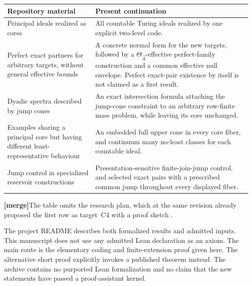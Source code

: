 \documentclass[11pt,letterpaper]{article}
\theoremstyle{plain}
\theoremstyle{definition}
\theoremstyle{remark}
\numberwithin{equation}{section}
\newcommand{\mergenote}[1]{\par\smallskip\noindent
 {\small\textsf{\textbf{[merge]}}\enspace #1}\par\smallskip}
\begin{document}
\begin{center}\small
\begin{tabularx}{\textwidth}{@{}>{\raggedright\arraybackslash}p{}>{\raggedright\arraybackslash}X@{}}
\toprule
Repository material & Present continuation\\
\midrule
Principal ideals realized as cores & All countable Turing ideals realized by one explicit two-level code.\\[4pt]
Perfect exact partners for arbitrary targets, without general effective bounds & A concrete normal form for the new targets, followed by a $\Theta_{\vec A}$-effective perfect-family construction and a common effective null envelope. Perfect exact-pair existence by itself is not claimed as a first result.\\[4pt]
Dyadic spectra described by jump cones & An exact intersection formula attaching the jump-cone constraint to an arbitrary row-finite mass problem, while leaving its core unchanged.\\[4pt]
Examples sharing a principal core but having different least-representative behaviour & An embedded full upper cone in every core fiber, and continuum many no-least classes for each countable ideal.\\[4pt]
Jump control in specialized reservoir constructions & Presentation-sensitive finite-join-jump control, and selected exact pairs with a prescribed common jump throughout every displayed fiber.\\
\bottomrule
\end{tabularx}
\end{center}

\mergenote{The table omits the research plan, which at the same revision already
proposed the first row as target~C4 with a proof sketch \cite{Plan}.}

The project README describes both formalized results and admitted inputs. This
manuscript does not use any admitted Lean declaration as an axiom. The main route is
the elementary coding and finite-extension proof given here. The alternative short
proof explicitly invokes a published theorem instead. The archive contains no
purported Lean formalization and no claim that the new statements have passed a
proof-assistant kernel.
\end{document}
